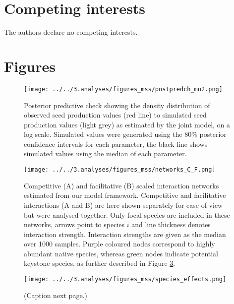 \documentclass[a4,12pt]{article}
\begin{document}
\section*{Competing interests}

The authors declare no competing interests. 


\newpage

\printbibliography   

\newpage 

\section{Figures}


    \begin{figure}[H]
        \texttt{[image: ../../3.analyses/figures\_mss/postpredch\_mu2.png]}
        \caption{Posterior predictive check showing the density distribution of observed seed production values (red line) to simulated seed production values (light grey) as estimated by the joint model, on a log scale. Simulated values were generated using the 80\% posterior confidence intervals for each parameter, the black line shows simulated values using the median of each parameter. }
        \label{fig:ppcheckmu2}
    \end{figure}

    \begin{figure}[H]
        \begin{centering}
        \texttt{[image: ../../3.analyses/figures\_mss/networks\_C\_F.png]}
        \caption{Competitive (A) and facilitative (B) scaled interaction networks estimated from our model framework. Competitive and facilitative interactions (A and B) are here shown separately for ease of view but were analysed together. Only focal species are included in these networks, arrows point to species $i$ and line thickness denotes interaction strength. Interaction strengths are given as the median over 1000 samples. Purple coloured nodes correspond to highly abundant native species, whereas green nodes indicate potential keystone species, as further described in Figure \ref{fig:species}.}
        \label{fig:netwks}
       \end{centering}
    \end{figure}  


    \begin{figure}[H]
        \begin{centering}
        \texttt{[image: ../../3.analyses/figures\_mss/species\_effects.png]}
        \caption{(Caption next page.)}
        \label{fig:species}
        \end{centering}
    \end{figure} 
\end{document}

